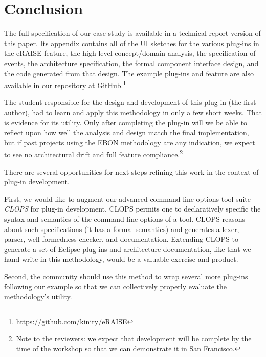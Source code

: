 \documentclass[conference]{IEEEtran}
\begin{document}
\section{Conclusion}
\label{sec:conclusion}

The full specification of our case study is available in a technical
report version of this paper.  Its appendix contains all of the UI
sketches for the various plug-ins in the eRAISE feature, the high-level
concept/domain analysis, the specification of events, the architecture
specification, the formal component interface design, and the code
generated from that design.  The example plug-ins and feature are also
available in our repository at
GitHub.\footnote{\url{https://github.com/kiniry/eRAISE}}

The student responsible for the design and development of this plug-in
(the first author), had to learn and apply this methodology in only a
few short weeks.  That is evidence for its utility.  Only after
completing the plug-in will we be able to reflect upon how well the
analysis and design match the final implementation, but if past
projects using the EBON methodology are any indication, we expect to
see no architectural drift and full feature compliance.\footnote{Note
  to the reviewers: we expect that development will be complete by the
  time of the workshop so that we can demonstrate it in San Francisco.}

There are several opportunities for next steps refining this work in
the context of plug-in development.  

First, we would like to augment our advanced command-line options tool
suite \emph{CLOPS} for plug-in development.  CLOPS permits one to
declaratively specific the syntax and semantics of the command-line
options of a tool.  CLOPS reasons about such specifications (it has a
formal semantics) and generates a lexer, parser, well-formedness
checker, and documentation.  Extending CLOPS to generate a set of
Eclipse plug-ins and architecture documentation, like that we
hand-write in this methodology, would be a valuable exercise and
product.

Second, the community should use this method to wrap several more
plug-ins following our example so that we can collectively properly
evaluate the methodology's utility.

\end{document}
